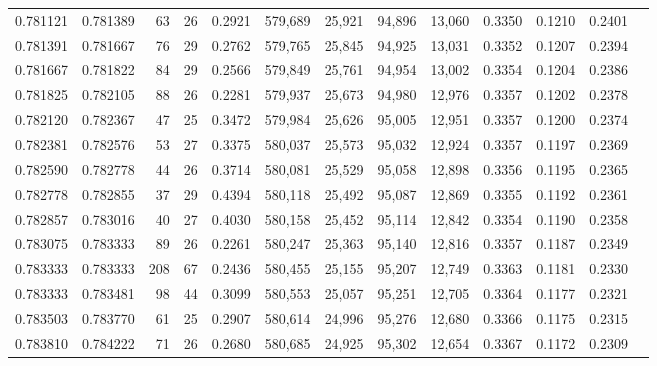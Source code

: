 \begin{tabular}{rrrrrrrrrrrrr}
0.781121 & 0.781389 &     63 &    26 &                                     0.2921 & 579,689 &  25,921 &  94,896 &  13,060 & 0.3350 & 0.1210 & 0.2401 \\
0.781391 & 0.781667 &     76 &    29 &                                     0.2762 & 579,765 &  25,845 &  94,925 &  13,031 & 0.3352 & 0.1207 & 0.2394 \\
0.781667 & 0.781822 &     84 &    29 &                                     0.2566 & 579,849 &  25,761 &  94,954 &  13,002 & 0.3354 & 0.1204 & 0.2386 \\
0.781825 & 0.782105 &     88 &    26 &                                     0.2281 & 579,937 &  25,673 &  94,980 &  12,976 & 0.3357 & 0.1202 & 0.2378 \\
0.782120 & 0.782367 &     47 &    25 &                                     0.3472 & 579,984 &  25,626 &  95,005 &  12,951 & 0.3357 & 0.1200 & 0.2374 \\
0.782381 & 0.782576 &     53 &    27 &                                     0.3375 & 580,037 &  25,573 &  95,032 &  12,924 & 0.3357 & 0.1197 & 0.2369 \\
0.782590 & 0.782778 &     44 &    26 &                                     0.3714 & 580,081 &  25,529 &  95,058 &  12,898 & 0.3356 & 0.1195 & 0.2365 \\
0.782778 & 0.782855 &     37 &    29 &                                     0.4394 & 580,118 &  25,492 &  95,087 &  12,869 & 0.3355 & 0.1192 & 0.2361 \\
0.782857 & 0.783016 &     40 &    27 &                                     0.4030 & 580,158 &  25,452 &  95,114 &  12,842 & 0.3354 & 0.1190 & 0.2358 \\
0.783075 & 0.783333 &     89 &    26 &                                     0.2261 & 580,247 &  25,363 &  95,140 &  12,816 & 0.3357 & 0.1187 & 0.2349 \\
0.783333 & 0.783333 &    208 &    67 &                                     0.2436 & 580,455 &  25,155 &  95,207 &  12,749 & 0.3363 & 0.1181 & 0.2330 \\
0.783333 & 0.783481 &     98 &    44 &                                     0.3099 & 580,553 &  25,057 &  95,251 &  12,705 & 0.3364 & 0.1177 & 0.2321 \\
0.783503 & 0.783770 &     61 &    25 &                                     0.2907 & 580,614 &  24,996 &  95,276 &  12,680 & 0.3366 & 0.1175 & 0.2315 \\
0.783810 & 0.784222 &     71 &    26 &                                     0.2680 & 580,685 &  24,925 &  95,302 &  12,654 & 0.3367 & 0.1172 & 0.2309 \\

\end{tabular}
